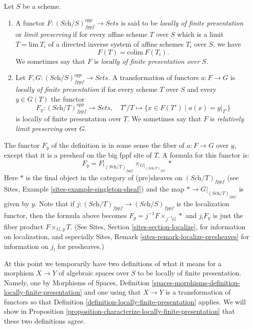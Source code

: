 \begin{definition}
\label{definition-locally-finite-presentation}
Let $S$ be a scheme.
\begin{enumerate}
\item A functor $F : (\textit{Sch}/S)_{fppf}^{opp} \to \textit{Sets}$
is said to be {\it locally of finite presentation} or {\it limit preserving} if
for every affine scheme $T$ over $S$ which is a limit $T = \text{lim}\ T_i$
of a directed inverse system of affine schemes $T_i$ over $S$, we have
$$
F(T) = \text{colim}\ F(T_i).
$$
We sometimes say that $F$ is {\it locally of finite presentation over $S$}.
\item Let $F, G : (\textit{Sch}/S)_{fppf}^{opp} \to \textit{Sets}$.
A transformation of functors $a : F \to G$
is {\it locally of finite presentation} if for every scheme $T$ over $S$
and every $y \in G(T)$ the functor
$$
F_y : (\textit{Sch}/T)_{fppf}^{opp} \longrightarrow \textit{Sets}, \quad
T'/T \longmapsto \{x \in F(T') \mid a(x) = y|_{T'}\}
$$
is locally of finite presentation over $T$. We sometimes say that
$F$ is {\it relatively limit preserving} over $G$.
\end{enumerate}
\end{definition}

\noindent
The functor $F_y$ of the definition is in some sense the fiber of
$a : F \to G$ over $y$, except that it is a presheaf on the big fppf
site of $T$. A formula for this functor is:
\begin{equation}
\label{equation-fibre-map-functors}
F_y =
F|_{(\textit{Sch}/T)_{fppf}}
{\times}_{G|_{(\textit{Sch}/T)_{fppf}}}
*
\end{equation}
Here $*$ is the final object in the category of (pre)sheaves
on $(\textit{Sch}/T)_{fppf}$ (see
Sites, Example \ref{sites-example-singleton-sheaf})
and the map $* \to G|_{(\textit{Sch}/T)_{fppf}}$ is given by $y$.
Note that if $j : (\textit{Sch}/T)_{fppf} \to (\textit{Sch}/S)_{fppf}$
is the localization functor, then the formula above becomes
$F_y = j^{-1}F \times_{j^{-1}G} *$ and $j_!F_y$ is just the fiber product
$F \times_{G, y} T$. (See
Sites, Section \ref{sites-section-localize},
for information on localization, and especially
Sites, Remark \ref{sites-remark-localize-presheaves}
for information on $j_!$ for presheaves.)

\medskip\noindent
At this point we temporarily have two definitions of what it means
for a morphism $X \to Y$ of algebraic spaces over $S$ to be locally of finite
presentation. Namely, one by
Morphisms of Spaces,
Definition \ref{spaces-morphisms-definition-locally-finite-presentation}
and one using that $X \to Y$ is a transformation of functors so that
Definition \ref{definition-locally-finite-presentation}
applies. We will show in
Proposition \ref{proposition-characterize-locally-finite-presentation}
that these two definitions agree.

